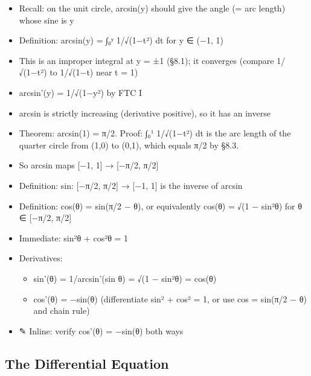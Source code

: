 \documentclass[
  10pt,
  letterpaper,
]{scrbook}
\providecommand{\tightlist}{%
  \setlength{\itemsep}{0pt}\setlength{\parskip}{0pt}}
\begin{document}
\begin{itemize}
\tightlist
\item
  Recall: on the unit circle, arcsin(y) should give the angle (= arc
  length) whose sine is y
\item
  Definition: arcsin(y) = ∫₀ʸ 1/√(1−t²) dt for y ∈ (−1, 1)
\item
  This is an improper integral at y = ±1 (§8.1); it converges (compare
  1/√(1−t²) to 1/√(1−t) near t = 1)
\item
  arcsin'(y) = 1/√(1−y²) by FTC I
\item
  arcsin is strictly increasing (derivative positive), so it has an
  inverse
\item
  Theorem: arcsin(1) = π/2. Proof: ∫₀¹ 1/√(1−t²) dt is the arc length of
  the quarter circle from (1,0) to (0,1), which equals π/2 by §8.3.
\item
  So arcsin maps {[}−1, 1{]} → {[}−π/2, π/2{]}
\item
  Definition: sin: {[}−π/2, π/2{]} → {[}−1, 1{]} is the inverse of
  arcsin
\item
  Definition: cos(θ) = sin(π/2 − θ), or equivalently cos(θ) = √(1 −
  sin²θ) for θ ∈ {[}−π/2, π/2{]}
\item
  Immediate: sin²θ + cos²θ = 1
\item
  Derivatives:

  \begin{itemize}
  \tightlist
  \item
    sin'(θ) = 1/arcsin'(sin θ) = √(1 − sin²θ) = cos(θ)
  \item
    cos'(θ) = −sin(θ) (differentiate sin² + cos² = 1, or use cos =
    sin(π/2 − θ) and chain rule)
  \end{itemize}
\item
  ✎ Inline: verify cos'(θ) = −sin(θ) both ways
\end{itemize}

\subsection{The Differential Equation}\label{the-differential-equation}
\end{document}
